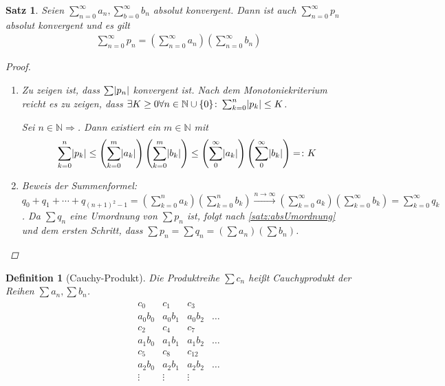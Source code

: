 \documentclass[ngerman,titlepage,twoside, parskip=half*]{scrreprt}
\newcommand*{\N}{\mathbb{N}}
\theoremstyle{break}
\newtheorem{theorem}{Satz}[section]
\newtheorem{definition}{Definition}[chapter]
\theoremstyle{nonumberbreak}
\newtheorem{proof}{Beweis:}
\DeclarePairedDelimiter{\abs}{\lvert}{\rvert}
\begin{document}
\begin{theorem}\label{satz:abskonvReihe}
  Seien $\sum_{n=0}^\infty a_n, \sum_{b=0}^\infty b_n$ absolut konvergent.
  Dann ist auch $\sum_{n=0}^\infty p_n$ absolut konvergent und es gilt
  \begin{gather*}
    \sum_{n=0}^\infty p_n=\left(\sum_{n=0}^\infty
       a_n\right)\left(\sum_{n=0}^\infty b_n\right)
  \end{gather*}
  \begin{proof}
    \begin{enumerate}[1.\,Schr{i}tt]
     \item Zu zeigen ist, dass $\sum \abs{p_n}$ konvergent ist. Nach dem
      Monotoniekriterium reicht es zu zeigen, dass $\exists K \geq 0 \forall n
      \in \N \cup \{0\}\colon \sum_{k=0}^n \abs{p_k}\leq K$.

      Sei $n \in \N \Rightarrow$. Dann existiert ein $m \in \N$ mit
      \begin{gather*}
	\sum_{k=0}^n \abs{p_k}
      \leq \left(\sum_{k=0}^m \abs{a_k}\right)\left(\sum_{k=0}^m
      \abs{b_k}\right) \leq \left(\sum_0^\infty
      \abs{a_k}\right)\left(\sum_0^\infty \abs{b_k}\right)=\colon K
      \end{gather*}
      
  \item Beweis der Summenformel:
    $q_0+q_1+\cdots +q_{(n+1)^2-1} =(\sum_{k=0}^n a_k)(\sum_{k=0}^n
      b_k)\xrightarrow{n\rightarrow \infty} (\sum_{k=0}^\infty
      a_k)(\sum_{k=0}^\infty b_k) =\sum_{k=0}^\infty q_k$. Da $\sum q_n$ eine
      Umordnung von $\sum p_n$ ist, folgt nach \autoref{satz:absUmordnung} und
      dem ersten Schritt, dass $\sum p_n=\sum q_n = (\sum a_n)(\sum b_n)$.
\end{enumerate}
  \end{proof}
\end{theorem}

\begin{definition}[Cauchy-Produkt]
  Die Produktreihe $\sum c_n$ heißt \emph{Cauchyprodukt}
  der Reihen $\sum a_n, \sum b_n$.
  \begin{gather*}
    \begin{matrix}
      c_{0}& c_{1}& c_{3}&\\
      a_{0}b_{0}& a_{0}b_{1}& a_{0}b_{2}& \dotso\\
      c_{2}& c_{4}& c_{7}&\\
      a_{1}b_{0}& a_{1}b_{1}& a_{1}b_{2}& \dotso \\
      c_{5}& c_{8}& c_{12}& \\
      a_{2}b_{0}& a_{2}b_{1}& a_{2}b_{2}& \dotso \\
      \vdots& \vdots& \vdots
    \end{matrix}
  \end{gather*}
\end{definition}
\end{document}
